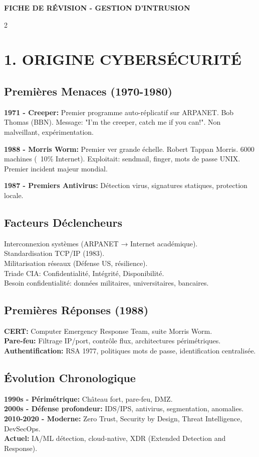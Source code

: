 \documentclass[9pt,a4paper]{extarticle}
\begin{document}
\begin{center}
\textbf{\large FICHE DE RÉVISION - GESTION D'INTRUSION}
\end{center}

\begin{multicols}{2}

\section*{1. ORIGINE CYBERSÉCURITÉ}

\subsection*{Premières Menaces (1970-1980)}
\textbf{1971 - Creeper:} Premier programme auto-réplicatif sur ARPANET. Bob Thomas (BBN). Message: "I'm the creeper, catch me if you can!". Non malveillant, expérimentation.

\textbf{1988 - Morris Worm:} Premier ver grande échelle. Robert Tappan Morris. 6000 machines (~10\% Internet). Exploitait: sendmail, finger, mots de passe UNIX. Premier incident majeur mondial.

\textbf{1987 - Premiers Antivirus:} Détection virus, signatures statiques, protection locale.

\subsection*{Facteurs Déclencheurs}
Interconnexion systèmes (ARPANET → Internet académique).\\
Standardisation TCP/IP (1983).\\
Militarisation réseaux (Défense US, résilience).\\
Triade CIA: Confidentialité, Intégrité, Disponibilité.\\
Besoin confidentialité: données militaires, universitaires, bancaires.

\subsection*{Premières Réponses (1988)}
\textbf{CERT:} Computer Emergency Response Team, suite Morris Worm.\\
\textbf{Pare-feu:} Filtrage IP/port, contrôle flux, architectures périmétriques.\\
\textbf{Authentification:} RSA 1977, politiques mots de passe, identification centralisée.

\subsection*{Évolution Chronologique}
\textbf{1990s - Périmétrique:} Château fort, pare-feu, DMZ.\\
\textbf{2000s - Défense profondeur:} IDS/IPS, antivirus, segmentation, anomalies.\\
\textbf{2010-2020 - Moderne:} Zero Trust, Security by Design, Threat Intelligence, DevSecOps.\\
\textbf{Actuel:} IA/ML détection, cloud-native, XDR (Extended Detection and Response).


\end{multicols}
\end{document}
